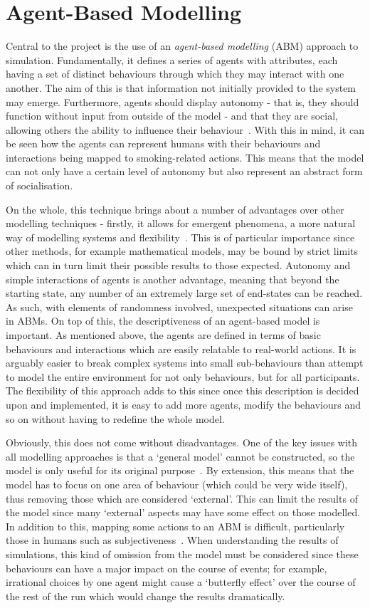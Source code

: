 \documentclass[]{report}
\begin{document}
\section{Agent-Based Modelling}
Central to the project is the use of an \emph{agent-based modelling} (ABM) approach to simulation. Fundamentally, it defines a series of agents with attributes, each having a set of distinct behaviours through which they may interact with one another. The aim of this is that information not initially provided to the system may emerge. Furthermore, agents should display autonomy - that is, they should function without input from outside of the model - and that they are social, allowing others the ability to influence their behaviour~\cite{repast-tut}. With this in mind, it can be seen how the agents can represent humans with their behaviours and interactions being mapped to smoking-related actions. This means that the model can not only have a certain level of autonomy but also represent an abstract form of socialisation.

On the whole, this technique brings about a number of advantages over other modelling techniques - firstly, it allows for emergent phenomena, a more natural way of modelling systems and flexibility~\cite{ABMMethTech}. This is of particular importance since other methods, for example mathematical models, may be bound by strict limits which can in turn limit their possible results to those expected. Autonomy and simple interactions of agents is another advantage, meaning that beyond the starting state, any number of an extremely large set of end-states can be reached. As such, with elements of randomness involved, unexpected situations can arise in ABMs. On top of this, the descriptiveness of an agent-based model is important. As mentioned above, the agents are defined in terms of basic behaviours and interactions which are easily relatable to real-world actions. It is arguably easier to break complex systems into small sub-behaviours than attempt to model the entire environment for not only behaviours, but for all participants. The flexibility of this approach adds to this since once this description is decided upon and implemented, it is easy to add more agents, modify the behaviours and so on without having to redefine the whole model.

Obviously, this does not come without disadvantages. One of the key issues with all modelling approaches is that a `general model' cannot be constructed, so the model is only useful for its original purpose~\cite{UCL-ABM}. By extension, this means that the model has to focus on one area of behaviour (which could be very wide itself), thus removing those which are considered `external'. This can limit the results of the model since many `external' aspects may have some effect on those modelled. In addition to this, mapping some actions to an ABM is difficult, particularly those in humans such as subjectiveness~\cite{ABMMethTech}. When understanding the results of simulations, this kind of omission from the model must be considered since these behaviours can have a major impact on the course of events; for example, irrational choices by one agent might cause a `butterfly effect' over the course of the rest of the run which would change the results dramatically.
\end{document}
